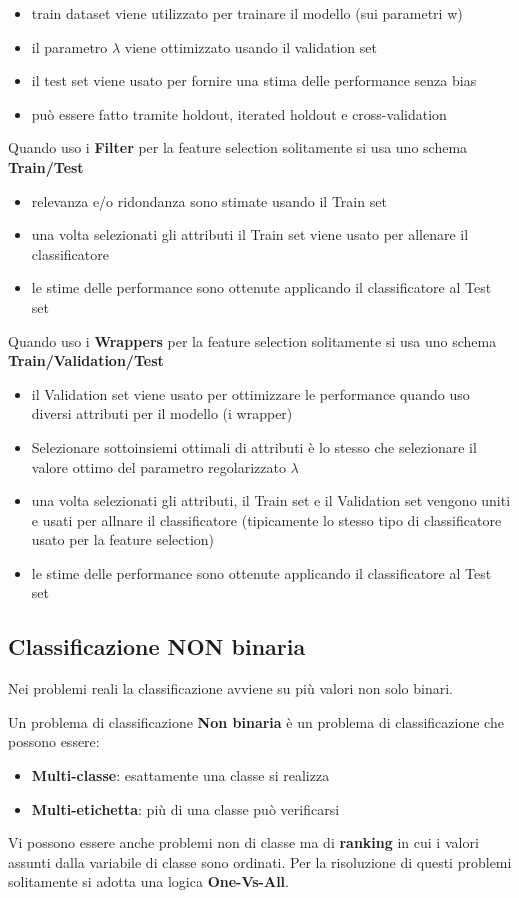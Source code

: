 \begin{itemize}
	\item train dataset viene utilizzato per trainare il modello (sui parametri w)
	\item il parametro $\lambda$ viene ottimizzato usando il validation set
	\item il test set viene usato per fornire una stima delle performance senza bias
	\item può essere fatto tramite holdout, iterated holdout e cross-validation
\end{itemize}
\noindent
Quando uso i \textbf{Filter} per la feature selection solitamente si usa uno schema \textbf{Train/Test}
\begin{itemize}
	\item relevanza e/o ridondanza sono stimate usando il Train set
	\item una volta selezionati gli attributi il Train set viene usato per allenare il classificatore
	\item le stime delle performance sono ottenute applicando il classificatore al Test set
\end{itemize}
\noindent
Quando uso i \textbf{Wrappers} per la feature selection solitamente si usa uno schema \textbf{Train/Validation/Test}
\begin{itemize}
	\item il Validation set viene usato per ottimizzare le performance quando uso diversi attributi per il modello (i wrapper)
	\item Selezionare sottoinsiemi ottimali di attributi è lo stesso che selezionare il valore ottimo del parametro regolarizzato $\lambda$
	\item una volta selezionati gli attributi, il Train set e il Validation set vengono uniti e usati per allnare il classificatore (tipicamente lo stesso tipo di classificatore usato per la feature selection)
	\item le stime delle performance sono ottenute applicando il classificatore al Test set
\end{itemize}

\subsection{Classificazione NON binaria}
Nei problemi reali la classificazione avviene su pi\`u valori non solo binari.
\begin{defn}
	Un problema di classificazione \textbf{Non binaria} è un problema di classificazione che possono essere:
	\begin{itemize}
		\item \textbf{Multi-classe}: esattamente una classe si realizza
		\item \textbf{Multi-etichetta}: pi\`u di una classe pu\`o verificarsi
	\end{itemize}
\end{defn}
Vi possono essere anche problemi non di classe ma di \textbf{ranking} in cui i valori assunti dalla variabile di classe sono ordinati.
Per la risoluzione di questi problemi solitamente si adotta una logica \textbf{One-Vs-All}.

